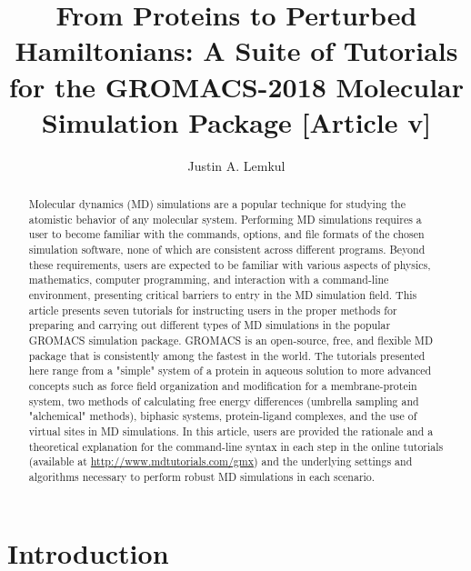 \documentclass[9pt,tutorial,pubversion]{livecoms}
\title{From Proteins to Perturbed Hamiltonians: A Suite of Tutorials for the GROMACS-2018 Molecular Simulation Package [Article v\versionnumber]}
\author[1*]{Justin A. Lemkul}
\affil[1]{Department of Biochemistry, Virginia Tech, Blacksburg, VA, United States of America}
\newcommand{\urlstring}{http://www.mdtutorials.com/gmx}
\newcommand{\tutorialhomeurl}{\url{\urlstring}}
\begin{document}
\begin{frontmatter}
\maketitle

\begin{abstract}

Molecular dynamics (MD) simulations are a popular technique for studying the atomistic behavior of any molecular system. Performing MD simulations requires a user to become familiar with the commands, options, and file formats of the chosen simulation software, none of which are consistent across different programs. Beyond these requirements, users are expected to be familiar with various aspects of physics, mathematics, computer programming, and interaction with a command-line environment, presenting critical barriers to entry in the MD simulation field. This article presents seven tutorials for instructing users in the proper methods for preparing and carrying out different types of MD simulations in the popular GROMACS simulation package. GROMACS is an open-source, free, and flexible MD package that is consistently among the fastest in the world. The tutorials presented here range from a "simple" system of a protein in aqueous solution to more advanced concepts such as force field organization and modification for a membrane-protein system, two methods of calculating free energy differences (umbrella sampling and "alchemical" methods), biphasic systems, protein-ligand complexes, and the use of virtual sites in MD simulations. In this article, users are provided the rationale and a theoretical explanation for the command-line syntax in each step in the online tutorials (available at \tutorialhomeurl) and the underlying settings and algorithms necessary to perform robust MD simulations in each scenario.

\end{abstract}

\end{frontmatter}


\section{Introduction}
\end{document}
